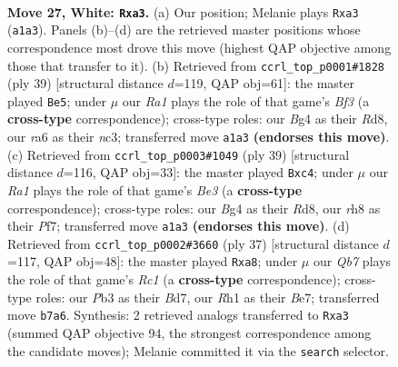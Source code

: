 \documentclass[11pt]{article}
\begin{document}
\clearpage

\begin{figure}[p]\centering
\begin{subfigure}{0.46\textwidth}\centering
\resizebox{\linewidth}{!}{%
\newchessgame
\chessboard[
  setfen={1n1qkb1r/1Q2n3/r1p3p1/p2p2P1/3P2Bp/pP5P/1BP1KP2/R2N3R w - - 0 27},
  showmover=false,
  pgfstyle=straightmove, color=movearrow, markmove={a1-a3}
]}
\caption{}
\end{subfigure}\hfill
\begin{subfigure}{0.46\textwidth}\centering
\resizebox{\linewidth}{!}{%
\newchessgame
\chessboard[
  setfen={3rk2r/1p3pp1/p2pbb2/7p/2qNP2P/2N3P1/PPPQ4/1K1R1R2 b k - 1 20},
  showmover=false,
  pgfstyle=straightmove, color=movearrow, markmove={f6-e5}
]}
\caption{}
\end{subfigure}
\\[4pt]
\begin{subfigure}{0.46\textwidth}\centering
\resizebox{\linewidth}{!}{%
\newchessgame
\chessboard[
  setfen={1r1r2k1/4bpp1/2p1bn1p/q3p3/P1N1P2B/4RN2/P1Q2PPP/2R3K1 b - - 2 20},
  showmover=false,
  pgfstyle=straightmove, color=movearrow, markmove={e6-c4}
]}
\caption{}
\end{subfigure}\hfill
\begin{subfigure}{0.46\textwidth}\centering
\resizebox{\linewidth}{!}{%
\newchessgame
\chessboard[
  setfen={R1r3k1/1q1bbpp1/1B1p1n1p/1p2p3/1P2P3/2N1Q3/1PPN1PPP/3R2K1 b - - 0 19},
  showmover=false,
  pgfstyle=straightmove, color=movearrow, markmove={c8-a8}
]}
\caption{}
\end{subfigure}
\caption{\textbf{Move 27, White: \texttt{Rxa3}.} (a) Our position; Melanie plays \texttt{Rxa3} (\texttt{a1a3}). Panels (b)--(d) are the retrieved master positions whose correspondence most drove this move (highest QAP objective among those that transfer to it). (b) Retrieved from \texttt{ccrl\_top\_p0001\#1828} (ply 39) [structural distance $d$=119, QAP obj=61]: the master played \texttt{Be5}; under $\mu$ our \emph{Ra1} plays the role of that game's \emph{Bf3} (a \textbf{cross-type} correspondence); cross-type roles: our \emph{B}g4 as their \emph{R}d8, our \emph{r}a6 as their \emph{n}c3; transferred move \texttt{a1a3} \textbf{(endorses this move)}. (c) Retrieved from \texttt{ccrl\_top\_p0003\#1049} (ply 39) [structural distance $d$=116, QAP obj=33]: the master played \texttt{Bxc4}; under $\mu$ our \emph{Ra1} plays the role of that game's \emph{Be3} (a \textbf{cross-type} correspondence); cross-type roles: our \emph{B}g4 as their \emph{R}d8, our \emph{r}h8 as their \emph{P}f7; transferred move \texttt{a1a3} \textbf{(endorses this move)}. (d) Retrieved from \texttt{ccrl\_top\_p0002\#3660} (ply 37) [structural distance $d$=117, QAP obj=48]: the master played \texttt{Rxa8}; under $\mu$ our \emph{Qb7} plays the role of that game's \emph{Rc1} (a \textbf{cross-type} correspondence); cross-type roles: our \emph{P}b3 as their \emph{B}d7, our \emph{R}h1 as their \emph{B}e7; transferred move \texttt{b7a6}. Synthesis: 2 retrieved analogs transferred to \texttt{Rxa3} (summed QAP objective 94, the strongest correspondence among the candidate moves); Melanie committed it via the \texttt{search} selector.}
\label{fig:thought-m52}
\end{figure}
\end{document}
